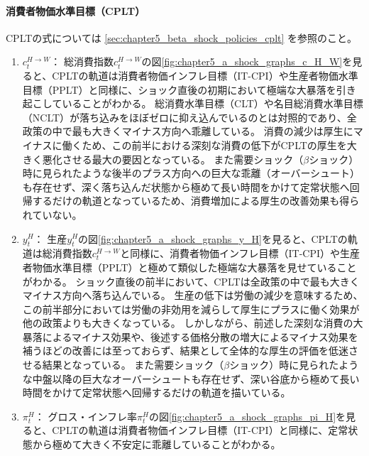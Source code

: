\paragraph{消費者物価水準目標（CPLT）}
\label{sec:chapter5_a_shock_policies_cplt}
CPLTの式については
\ref{sec:chapter5_beta_shock_policies_cplt}
を参照のこと。
\begin{enumerate}
    \item
    \label{itm:chapter5_a_shock_policies_cplt_c_H_W}
        \(c_t^{H\to W}\)：
        総消費指数\(c_t^{H\to W}\)の図\ref{fig:chapter5_a_shock_graphs_c_H_W}を見ると、CPLTの軌道は消費者物価インフレ目標（IT-CPI）や生産者物価水準目標（PPLT）と同様に、ショック直後の初期において極端な大暴落を引き起こしていることがわかる。
        総消費水準目標（CLT）や名目総消費水準目標（NCLT）が落ち込みをほぼゼロに抑え込んでいるのとは対照的であり、全政策の中で最も大きくマイナス方向へ乖離している。
        消費の減少は厚生にマイナスに働くため、この前半における深刻な消費の低下がCPLTの厚生を大きく悪化させる最大の要因となっている。
        また需要ショック（\(\beta\)ショック）時に見られたような後半のプラス方向への巨大な乖離（オーバーシュート）も存在せず、深く落ち込んだ状態から極めて長い時間をかけて定常状態へ回帰するだけの軌道となっているため、消費増加による厚生の改善効果も得られていない。
    \item
    \label{itm:chapter5_a_shock_policies_cplt_y_H}
        \(y_t^H\)：
        生産\(y_t^H\)の図\ref{fig:chapter5_a_shock_graphs_y_H}を見ると、CPLTの軌道は総消費指数\(c_t^{H\to W}\)と同様に、消費者物価インフレ目標（IT-CPI）や生産者物価水準目標（PPLT）と極めて類似した極端な大暴落を見せていることがわかる。
        ショック直後の前半において、CPLTは全政策の中で最も大きくマイナス方向へ落ち込んでいる。
        生産の低下は労働の減少を意味するため、この前半部分においては労働の非効用を減らして厚生にプラスに働く効果が他の政策よりも大きくなっている。
        しかしながら、前述した深刻な消費の大暴落によるマイナス効果や、後述する価格分散の増大によるマイナス効果を補うほどの改善には至っておらず、結果として全体的な厚生の評価を低迷させる結果となっている。
        また需要ショック（\(\beta\)ショック）時に見られたような中盤以降の巨大なオーバーシュートも存在せず、深い谷底から極めて長い時間をかけて定常状態へ回帰するだけの軌道を描いている。
    \item
    \label{itm:chapter5_a_shock_policies_cplt_pi_H}
        \(\pi_t^H\)：
        グロス・インフレ率\(\pi_t^H\)の図\ref{fig:chapter5_a_shock_graphs_pi_H}を見ると、CPLTの軌道は消費者物価インフレ目標（IT-CPI）と同様に、定常状態から極めて大きく不安定に乖離していることがわかる。

\end{enumerate}
